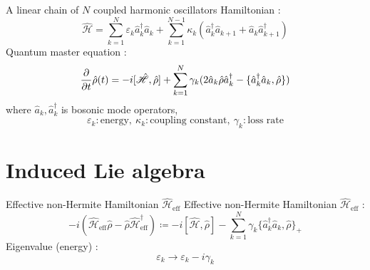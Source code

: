 \documentclass[
    14pt,luatex,unicode,professionalfont,aspectratio=169,
    xcolor=dvipsnames,
    hyperref={unicode,hidelinks,pdfusetitle}
]{beamer}
\begin{document}
\begin{frame}{A linear chain of $N$ coupled harmonic oscillators}
    Hamiltonian :
    \begin{equation}
        \hat{\mathscr{H}}
        = \sum_{k=1}^N \varepsilon_k \hat{a}_k^\dag \hat{a}_k
            + \sum_{k=1}^{N-1} \kappa_k (\hat{a}_k^\dag\hat{a}_{k+1}
                + \hat{a}_k\hat{a}_{k+1}^\dag)
    \end{equation}
    Quantum master equation :
    \begin{equation}
        \pdv{t}\hat{\rho}(t)
        = -i[\hat{\mathscr{H}},\hat{\rho}]
            + \sum_{k=1}^N \gamma_k (2\hat{a}_k\hat{\rho}\hat{a}_k^\dag
                - \{\hat{a}_k^\dag\hat{a}_k,\hat{\rho}\})
        \label{eq:quantum master equation for harmonic oscillators}
    \end{equation}
    where \quad\qquad $\hat{a}_k, \hat{a}_k^\dag$ is bosonic mode operators,
    \begin{equation*}
        \varepsilon_k : \text{energy}, \
        \kappa_k : \text{coupling constant}, \
        \gamma_k : \text{loss rate}
    \end{equation*}
\end{frame}

\section{Induced Lie algebra}
\begin{frame}{Effective non-Hermite Hamiltonian $\hat{\mathscr{H}}_\mathrm{eff}$}
    \alert{Effective non-Hermite Hamiltonian} $\hat{\mathscr{H}}_\mathrm{eff}$ :
    \begin{equation}
        -i(\hat{\mathscr{H}}_\mathrm{eff}\hat{\rho}
            - \hat{\rho}\hat{\mathscr{H}}_\mathrm{eff}^\dag)
        \coloneqq -i[\hat{\mathscr{H}},\hat{\rho}]
            - \sum_{k=1}^N \gamma_k \{\hat{a}_k^\dag\hat{a}_k,\hat{\rho}\}_+
    \end{equation}
    Eigenvalue (energy) :
    \begin{equation}
        \varepsilon_k \longrightarrow \varepsilon_k - i\gamma_k
    \end{equation}
\end{frame}
\end{document}
